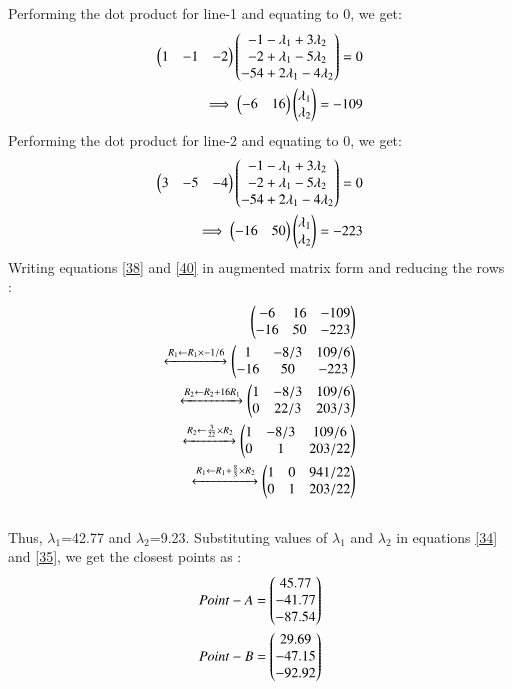 \documentclass[journal,12pt,twocolumn]{IEEEtran}
\begin{document}
Performing the dot product for line-1 and equating to 0, we get:
\begin{align}
\begin{pmatrix}1 & -1 & -2\end{pmatrix}
\begin{pmatrix}-1-\lambda_1+3\lambda_2 \\ -2+\lambda_1-5\lambda_2\\ -54+2\lambda_1-4\lambda_2\end{pmatrix}=0\\
\implies \begin{pmatrix}-6 & 16\end{pmatrix}\begin{pmatrix}\lambda_1 \\ \lambda_2\end{pmatrix}=-109 \label{38}
\end{align}
\newpage \noindent
Performing the dot product for line-2 and equating to 0, we get:
\begin{align}
\begin{pmatrix}3 & -5 & -4\end{pmatrix}
\begin{pmatrix}-1-\lambda_1+3\lambda_2 \\ -2+\lambda_1-5\lambda_2\\ -54+2\lambda_1-4\lambda_2\end{pmatrix}=0 \\
\implies \begin{pmatrix}-16 & 50\end{pmatrix}\begin{pmatrix}\lambda_1 \\ \lambda_2\end{pmatrix}=-223 \label{40}
\end{align}
Writing equations \ref{38} and \ref{40} in augmented matrix form and reducing the rows :\\
\begin{align}
\begin{pmatrix}-6 & 16 & -109\\-16 & 50 & -223\end{pmatrix}\\
\xleftrightarrow[]{R_1\leftarrow R_1\times-1/6}
\begin{pmatrix}1 & -8/3 & 109/6\\-16 & 50 & -223\end{pmatrix}\\
\xleftrightarrow[]{R_2\leftarrow R_2+16R_1}
\begin{pmatrix}1 & -8/3 & 109/6\\0 & 22/3 & 203/3\end{pmatrix}\\
\xleftrightarrow[]{R_2\leftarrow \frac{3}{22}\times R_2}
\begin{pmatrix}1 & -8/3 & 109/6\\0 & 1 & 203/22\end{pmatrix}\\
\xleftrightarrow[]{R_1\leftarrow R_1+\frac{8}{3}\times R_2}
\begin{pmatrix}1 & 0 & 941/22\\0 & 1 & 203/22\end{pmatrix}
\end{align}
\\
Thus, $\lambda_1$=42.77 and $\lambda_2$=9.23. Substituting values of $\lambda_1$ and $\lambda_2$ in equations \ref{34} and \ref{35}, we get the closest points as :\\
\begin{align}
 Point-A = \begin{pmatrix}45.77 \\ -41.77\\ -87.54\end{pmatrix}\\ 
   Point-B= \begin{pmatrix}29.69\\ -47.15\\ -92.92\end{pmatrix} 
\end{align} 
\end{document}
